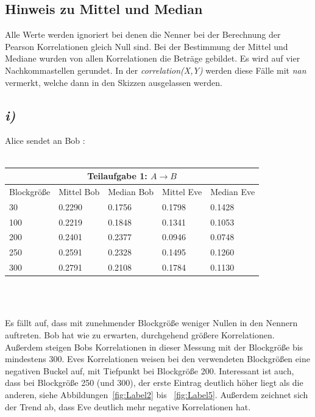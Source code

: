 \documentclass[12pt,a4paper]{article}
\begin{document}
\subsection*{Hinweis zu Mittel und Median}

Alle Werte werden ignoriert bei denen die Nenner bei der 
Berechnung der Pearson Korrelationen gleich Null sind. 
Bei der Bestimmung der Mittel und Mediane wurden von allen 
Korrelationen die Beträge gebildet. Es wird auf vier 
Nachkommastellen gerundet. In der \textit{correlation(X,Y)}
werden diese Fälle mit \textit{nan} vermerkt, welche dann 
in den Skizzen ausgelassen werden.


\subsection*{\textit{i)}}


Alice sendet an Bob :\\~\\


\Large
\begin{tabular}{ |p{3cm}|||p{3cm}|p{3cm}||p{3cm}|p{3cm}|}
    \hline
    \multicolumn{5}{|c|}{Teilaufgabe 1: $A\rightarrow B$} \\
    \hline
    Blockgröße & Mittel Bob & Median Bob & Mittel Eve & Median Eve\\
    \hline
    \hspace{3.2mm}30 & 0.2290 & 0.1756 & 0.1798 & 0.1428\\
    100 & 0.2219 & 0.1848 & 0.1341 & 0.1053\\
    200 & 0.2401 & 0.2377 & 0.0946 & 0.0748\\
    250 & 0.2591 & 0.2328 & 0.1495 & 0.1260\\
    300 & 0.2791 & 0.2108 & 0.1784 & 0.1130\\
    \hline
\end{tabular}
\\[0.7cm]\\
\normalsize

Es fällt auf, dass mit zunehmender Blockgröße weniger Nullen in den 
Nennern auftreten. Bob hat wie zu erwarten, durchgehend größere 
Korrelationen. Außerdem steigen Bobs Korrelationen in dieser Messung 
mit der Blockgröße bis mindestens 300. Eves Korrelationen weisen
bei den verwendeten Blockgrößen eine negativen Buckel auf, mit 
Tiefpunkt bei Blockgröße 200. Interessant ist auch, dass bei 
Blockgröße 250 (und 300), der erste Eintrag deutlich höher liegt 
als die anderen, siehe Abbildungen~\ref{fig:Label2} bis 
~\ref{fig:Label5}. Außerdem zeichnet sich 
der Trend ab, dass Eve deutlich mehr negative Korrelationen hat.
\end{document}
